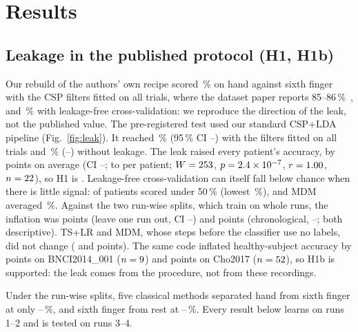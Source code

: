 \section{Results}
\label{sec:results}

\subsection{Leakage in the published protocol (H1, H1b)}
\label{sec:leak}
Our rebuild of the authors' own recipe scored
\rqOneCspLdaReplicaPaperReplicaMean\,\% on hand against sixth finger with the
CSP filters fitted on all trials, where the dataset paper reports
85--86\,\%~\cite{wang2026dataset}, and \rqOneCspLdaReplicaCvLeakfreeMean\,\%
with leakage-free cross-validation: we reproduce the direction of the leak,
not the published value. The pre-registered test used our standard CSP+LDA
pipeline (Fig.~\ref{fig:leak}). It reached \rqOneCspLdaPaperReplicaMean\,\%
(95\,\% CI \rqOneCspLdaPaperReplicaCiLo--\rqOneCspLdaPaperReplicaCiHi) with
the filters fitted on all trials and \rqOneCspLdaCvLeakfreeMean\,\%
(\rqOneCspLdaCvLeakfreeCiLo--\rqOneCspLdaCvLeakfreeCiHi) without leakage. The
leak raised every patient's accuracy, by \rqOneHOneDiff{} points on average
(CI \rqOneHOneDiffCiLo--\rqOneHOneDiffCiHi; \rqOneHOneDiffMin{} to
\rqOneHOneDiffMax{} per patient; $W = 253$, $p = 2.4\times10^{-7}$,
$r = 1.00$, $n = 22$), so H1 is \rqOneHOneCategory.
Leakage-free cross-validation can itself fall below chance when there is
little signal: \rqOneCspLdaCvLeakfreeNBelowChance{} of \rqOneHOneN{} patients
scored under 50\,\% (lowest \rqOneCspLdaCvLeakfreeMin\,\%), and MDM averaged
\rqOneMdmCvLeakfreeMean\,\%. Against the two run-wise splits, which train on
whole runs, the inflation was \rqOneCspLdaPaperReplicaMinusLoroDiff{} points
(leave one run out, CI
\rqOneCspLdaPaperReplicaMinusLoroDiffCiLo--\rqOneCspLdaPaperReplicaMinusLoroDiffCiHi)
and \rqOneCspLdaPaperReplicaMinusChronoDiff{} points (chronological,
\rqOneCspLdaPaperReplicaMinusChronoDiffCiLo--\rqOneCspLdaPaperReplicaMinusChronoDiffCiHi;
both descriptive). TS+LR and MDM, whose steps before the classifier use no
labels, did not change (\rqOneTsLrLeakDiff{} and \rqOneMdmLeakDiff{} points).
The same code inflated healthy-subject accuracy by \rqOneBnciHOneBDiff{}
points on BNCI2014\_001 ($n = 9$) and \rqOneChoHOneBDiff{}
points on Cho2017 ($n = 52$), so H1b is supported: the leak comes
from the procedure, not from these recordings.

Under the run-wise splits, five classical methods separated hand from sixth
finger at only \rqOneHeldOutRunsMeanMin--\rqOneHeldOutRunsMeanMax\,\%, and
sixth finger from rest at
\rqOneSfRestHeldOutRunsMeanMin--\rqOneSfRestHeldOutRunsMeanMax\,\%. Every
result below learns on runs 1--2 and is tested on runs 3--4.

